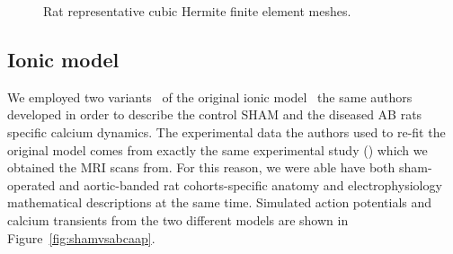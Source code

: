 \begin{figure}[!ht]
    \myfloatalign
    \quad
    \caption{Rat representative cubic Hermite finite element meshes.}
    \label{fig:ratrepgeom}
\end{figure}


%
%
%
\subsection{Ionic model}
We employed two variants~\cite{Gattoni:2017} of the original ionic model~\cite{Gattoni:2016} the same authors developed in order to describe the control SHAM and the diseased AB rats specific calcium dynamics. The experimental data the authors used to re-fit the original model comes from exactly the same experimental study (\cite{Roe:2017}) which we obtained the MRI scans from. For this reason, we were able have both sham-operated and aortic-banded rat cohorts-specific anatomy and electrophysiology mathematical descriptions at the same time. Simulated action potentials and calcium transients from the two different models are shown in Figure~\ref{fig:shamvsabcaap}.

